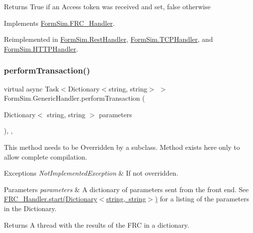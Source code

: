 \begin{DoxyReturn}{Returns}
True if an Access token was received and set, false otherwise
\end{DoxyReturn}


Implements \mbox{\hyperlink{interface_form_sim_1_1_f_r_c___handler_a32c299d3cb3cdd6c444e76b3671af1b4}{Form\+Sim.\+F\+R\+C\+\_\+\+Handler}}.



Reimplemented in \mbox{\hyperlink{class_form_sim_1_1_rest_handler_abd5c425be2b6c9e30ca3cfc0fb696aa9}{Form\+Sim.\+Rest\+Handler}}, \mbox{\hyperlink{class_form_sim_1_1_t_c_p_handler_a61075c8a24b97ae7c86d357d6ee5a49e}{Form\+Sim.\+T\+C\+P\+Handler}}, and \mbox{\hyperlink{class_form_sim_1_1_h_t_t_p_handler_ae2ace13d7dc63f0bf1e1ef1a41bf8a3e}{Form\+Sim.\+H\+T\+T\+P\+Handler}}.

\mbox{\label{class_form_sim_1_1_generic_handler_a824697e5c22a4f1cf8ce4e512b6954ad}} 
\subsubsection{\texorpdfstring{perform\+Transaction()}{performTransaction()}}
{\footnotesize\ttfamily virtual async Task$<$Dictionary$<$string, string$>$ $>$ Form\+Sim.\+Generic\+Handler.\+perform\+Transaction (\begin{DoxyParamCaption}\item[{Dictionary$<$ string, string $>$}]{parameters }\end{DoxyParamCaption})\hspace{0.3cm}{\ttfamily [inline]}, {\ttfamily [protected]}, {\ttfamily [virtual]}}



This method needs to be Overridden by a subclass. Method exists here only to allow complete compilation. 


\begin{DoxyExceptions}{Exceptions}
{\em Not\+Implemented\+Exception} & If not overridden.\\
\hline
\end{DoxyExceptions}

\begin{DoxyParams}{Parameters}
{\em parameters} & A dictionary of parameters sent from the front end. See \mbox{\hyperlink{interface_form_sim_1_1_f_r_c___handler_a2a2a8a776e774e5f8b5e2b7e623a26a6}{F\+R\+C\+\_\+\+Handler.\+start(\+Dictionary$<$string, string$>$)}} for a listing of the parameters in the Dictionary.\\
\hline
\end{DoxyParams}
\begin{DoxyReturn}{Returns}
A thread with the results of the F\+RC in a dictionary.
\end{DoxyReturn}


